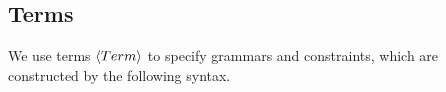 \documentclass[english,a4paper,10pt]{article}
\begin{document}
\subsection{Terms}

We use terms $\left\langle Term\right\rangle$ to specify grammars and constraints,
which are constructed by the following syntax.
\begin{comment}
\begin{alignat*}{1}
 & \begin{array}{rcl}
\term & ::= & \qualidentifier\\
 & | & \literal\\
 & | & \paren{\qualidentifier\mbox{ }\kplus{\term}}\\
 & | & \paren{\existskwd\mbox{ }\paren{\kplus{\sortedvar}}\mbox{ }\term}\\
 & | & \paren{\forallkwd\mbox{ }\paren{\kplus{\sortedvar}}\mbox{ }\term}\\
 & | & \paren{\letkwd\mbox{ }\paren{\kplus{\varbinding}}\mbox{ }\term}\\[2ex]
 \bfterm & ::= & \qualidentifier\\
 & | & \literal\\
 & | & \paren{\qualidentifier\mbox{ }\kplus{\bfterm}}\\[2ex]
 \qualidentifier & ::= & \identifier\mbox{ }|\mbox{ }\paren{\askwd\mbox{ }\identifier\mbox{ }\sortexpr}\\
 \sortedvar & ::= & \paren{\symbol\mbox{ }\sortexpr}\\
 \varbinding & ::= & \paren{\symbol\mbox{ }\term}\\
\end{array}
\end{alignat*}
Above,
we distinguish a subclass of \emph{binder-free} terms $\bfterm$ in the syntax above,
which do not contain bound (local) variables.
Identifiers that comprise terms
may be \emph{qualified} with a type-cast, using the keyword $\askwd$.
Type casts are used for symbols whose type is ambiguous,
such as parametric datatype constructors, e.g. the nil constructor
for a parametric list.

Like sorts, the identifiers that comprise terms
can either be defined by the user or by background theories.
Examples of the latter are given in \cref{ssec:smt-logic}.
\end{comment}
\end{document}
